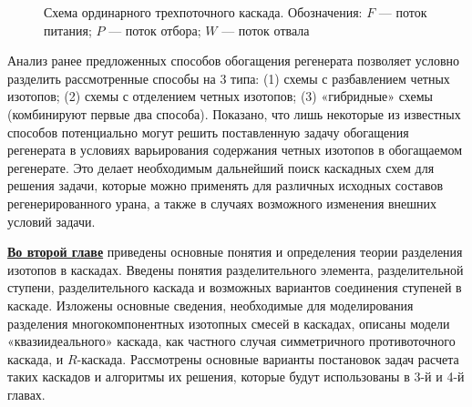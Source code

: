 \begin{figure}[ht]
  \caption{Схема ординарного трехпоточного каскада. Обозначения: $F$ --- поток питания; $P$ --- поток отбора; $W$ --- поток отвала}\label{ordinary}
\end{figure}

Анализ ранее предложенных способов обогащения регенерата позволяет условно разделить рассмотренные способы на 3 типа: (1) схемы с разбавлением четных изотопов; (2) схемы с отделением четных изотопов; (3) «гибридные» схемы (комбинируют первые два способа).
Показано, что лишь некоторые из известных способов потенциально могут решить поставленную задачу обогащения регенерата в условиях варьирования содержания четных изотопов в обогащаемом регенерате. Это делает необходимым дальнейший поиск каскадных схем для решения задачи, которые можно применять для различных исходных составов регенерированного урана, а также в случаях возможного изменения внешних условий задачи. 

\underline{\textbf{Во второй главе}} приведены основные понятия и определения теории разделения изотопов в каскадах. Введены понятия  разделительного элемента, разделительной ступени, разделительного каскада и возможных вариантов соединения ступеней в каскаде. Изложены основные сведения, необходимые для моделирования разделения многокомпонентных изотопных смесей в каскадах, описаны модели «квазиидеального» каскада, как частного случая симметричного противоточного каскада, и $R$-каскада. Рассмотрены основные варианты постановок задач расчета таких каскадов и алгоритмы их решения, которые будут использованы в 3-й и 4-й главах. 

